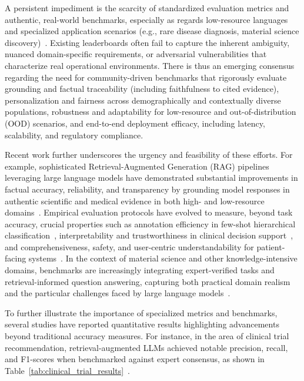 \documentclass[sigconf]{acmart}
\begin{document}
A persistent impediment is the scarcity of standardized evaluation metrics and authentic, real-world benchmarks, especially as regards low-resource languages and specialized application scenarios (e.g., rare disease diagnosis, material science discovery)~\cite{ref8,ref16,ref20,ref25,ref29,ref32,ref36,ref39,ref40,ref46,ref47,ref48,ref50,ref53,ref54,ref55}. Existing leaderboards often fail to capture the inherent ambiguity, nuanced domain-specific requirements, or adversarial vulnerabilities that characterize real operational environments. There is thus an emerging consensus regarding the need for community-driven benchmarks that rigorously evaluate grounding and factual traceability (including faithfulness to cited evidence), personalization and fairness across demographically and contextually diverse populations, robustness and adaptability for low-resource and out-of-distribution (OOD) scenarios, and end-to-end deployment efficacy, including latency, scalability, and regulatory compliance.

Recent work further underscores the urgency and feasibility of these efforts. For example, sophisticated Retrieval-Augmented Generation (RAG) pipelines leveraging large language models have demonstrated substantial improvements in factual accuracy, reliability, and transparency by grounding model responses in authentic scientific and medical evidence in both high- and low-resource domains~\cite{ref8,ref29,ref53,ref54,ref55}. Empirical evaluation protocols have evolved to measure, beyond task accuracy, crucial properties such as annotation efficiency in few-shot hierarchical classification~\cite{ref16}, interpretability and trustworthiness in clinical decision support~\cite{ref50,ref53}, and comprehensiveness, safety, and user-centric understandability for patient-facing systems~\cite{ref55}. In the context of material science and other knowledge-intensive domains, benchmarks are increasingly integrating expert-verified tasks and retrieval-informed question answering, capturing both practical domain realism and the particular challenges faced by large language models~\cite{ref29,ref32}.

To further illustrate the importance of specialized metrics and benchmarks, several studies have reported quantitative results highlighting advancements beyond traditional accuracy measures. For instance, in the area of clinical trial recommendation, retrieval-augmented LLMs achieved notable precision, recall, and F1-scores when benchmarked against expert consensus, as shown in Table~\ref{tab:clinical_trial_results}~\cite{ref53}.
\end{document}
